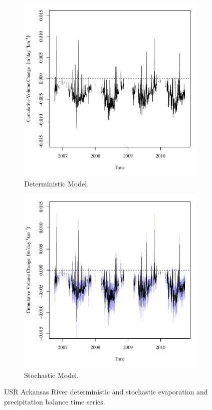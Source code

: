 \begin{linenumbers}
\begin{figure}[htbp]
\centering
	\begin{subfigure}{0.5\textwidth}
		\centering
		\includegraphics[width=0.9\linewidth]{"Figures/Results_DUSR/Balance Water - atm"}
		\caption{Deterministic Model.}
		\label{sub:USRWaterAtmD}
	\end{subfigure}%
	\begin{subfigure}{0.5\textwidth}
		\centering
		\includegraphics[width=0.9\linewidth]{"Figures/Results_USR/Balance Water - atm"}
		\caption{Stochastic Model.}
		\label{sub:USRWaterAtmS}
	\end{subfigure}
	\caption[USR Arkansas River deterministic and stochastic evaporation and precipitation balance time series.]{USR Arkansas River deterministic and stochastic evaporation and precipitation balance time series.}
	\label{fig:USRWaterAtm}
\end{figure}


\end{linenumbers}

